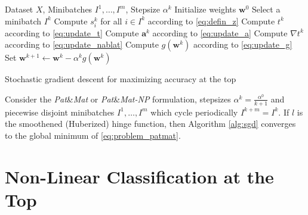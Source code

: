 \documentclass{Thesis}
\newcommand{\PatMat}{\emph{Pat}\&\emph{Mat}\xspace}
\newcommand{\PatMatNP}{{\emph{Pat}\&\emph{Mat-NP}}\xspace}
\begin{document}
\begin{algorithm}[!ht]
  \begin{algorithmic}[1]
    \Require Dataset $X$, Minibatches $I^1,\dots,I^m$, Stepsize $\alpha^k$
    \State Initialize weights $\bm{w}^0$
    \State Select a minibatch $I^k$
    \State Compute $s_i^k$ for all $i\in I^k$ according to \eqref{eq:defin_z}
    \State Compute $t^k$ according to \eqref{eq:update_t}
    \State Compute $\bm{a}^k$ according to \eqref{eq:update_a}
    \State Compute $\nabla t^k$ according to \eqref{eq:update_nablat}
    \State Compute $g(\bm{w}^k)$ according to \eqref{eq:update_g}
    \State Set $\bm{w}^{k+1}\gets \bm{w}^k - \alpha^k g(\bm{w}^k)$
    \EndFor
  \end{algorithmic}
  \caption{Stochastic gradient descent for maximizing accuracy at the top}
  \label{alg:sgd}
\end{algorithm}

\begin{theorem}\label{thm:sgd}
  Consider the \PatMat or \PatMatNP formulation, stepsizes $\alpha^k = \frac{\alpha^0}{k+1}$ and piecewise disjoint minibatches $I^1,\dots,I^m$ which cycle periodically $I^{k+m}=I^k$. If $l$ is the smoothened (Huberized) hinge function, then Algorithm \ref{alg:sgd} converges to the global minimum of \eqref{eq:problem_patmat}.  
\end{theorem}

\chapter{Non-Linear Classification at the Top}

\cleardoublepage
{}
{}


\end{document}
